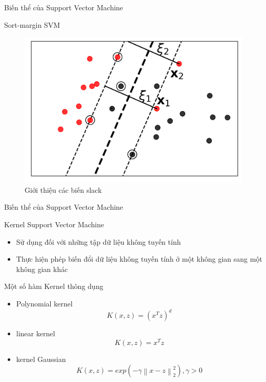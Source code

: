 \documentclass[
	10pt,                %
	aspectratio=169,     %
]{beamer}
\begin{document}
    \begin{frame}{Biến thể của Support Vector Machine}
        \begin{block}{Sort-margin SVM}
          \begin{figure}[h!]
        	\includegraphics[scale=0.5]{figures/slackVariable.png}
        	\caption{Giới thiệu các biến slack }
        \end{figure}  
        \end{block}
    \end{frame}	
    
     \begin{frame}{Biến thể của Support Vector Machine}
    \begin{block}{Kernel Support Vector Machine}
    	\begin{itemize}
    		\item  Sử dụng đối với những tập dữ liệu không tuyến tính
    		\item Thực hiện phép biến đổi dữ liệu không tuyến tính ở một không gian sang một không gian khác
    	\end{itemize}
        \end{block}
        
        \begin{block}{Một số hàm Kernel thông dụng}
    	\begin{itemize}
    		\item Polynomial kernel $$K(x,z)=(x^{T}z)^{d}$$
    		\item linear kernel $$K(x,z)=x^{T}z$$
    		\item kernel Gaussian $$K(x,z)=exp(-\gamma \left \| x-z \right \|^{2}_{2}), \gamma > 0$$
    	\end{itemize}
        \end{block}
    \end{frame}	
    
\end{document}
